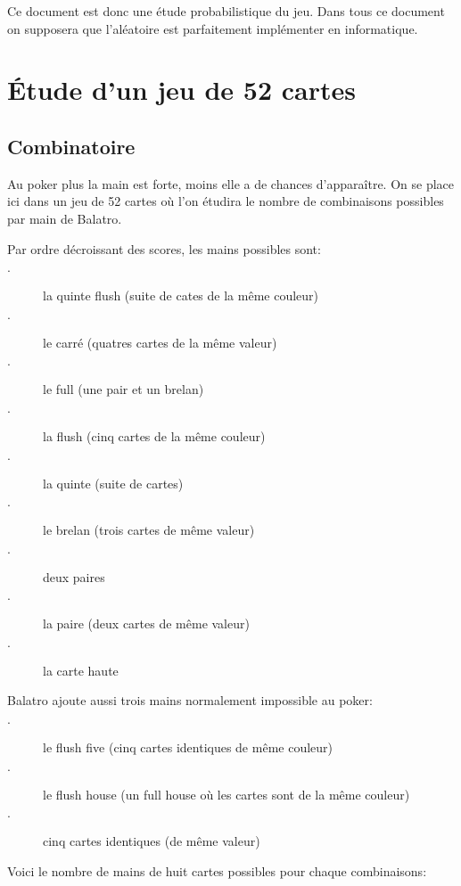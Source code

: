 \documentclass[10pt]{report}
\begin{document}
    Ce document est donc une étude probabilistique du jeu. 
    Dans tous ce document on supposera que l'aléatoire est parfaitement 
    implémenter en informatique.

    \chapter{Étude d'un jeu de 52 cartes}
    
    \section{Combinatoire}

    Au poker plus la main est forte, moins elle a de chances d'apparaître.
    On se place ici dans un jeu de 52 cartes où l'on étudira le nombre de 
    combinaisons possibles par main de Balatro.

    Par ordre décroissant des scores, les mains possibles sont:
    \begin{description}
        \item[$\cdot$] la quinte flush (suite de cates de la même couleur)
        \item[$\cdot$] le carré (quatres cartes de la même valeur)
        \item[$\cdot$] le full (une pair et un brelan)
        \item[$\cdot$] la flush (cinq cartes de la même couleur)
        \item[$\cdot$] la quinte (suite de cartes)
        \item[$\cdot$] le brelan (trois cartes de même valeur)
        \item[$\cdot$] deux paires 
        \item[$\cdot$] la paire (deux cartes de même valeur)
        \item[$\cdot$] la carte haute
    \end{description}
    Balatro ajoute aussi trois mains normalement impossible au poker: 
    \begin{description}
        \item[$\cdot$] le flush five (cinq cartes identiques de même 
    couleur)
        \item[$\cdot$] le flush house (un full house où les cartes 
    sont de la même couleur)
        \item[$\cdot$] cinq cartes identiques (de même valeur)
    \end{description}
    Voici le nombre de mains de huit cartes possibles pour chaque combinaisons:
\end{document}
